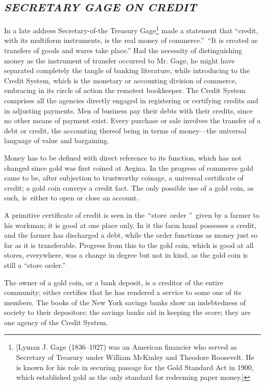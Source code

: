 \documentclass[openany,nobib]{tufte-book}
\begin{document}
\enlargethispage{\baselineskip}

\hypertarget{secretary-gage-on-credit}{%
\subsection{\texorpdfstring{\emph{SECRETARY GAGE ON
CREDIT}}{SECRETARY GAGE ON CREDIT}}\label{secretary-gage-on-credit}}

In a late address Secretary-of-the Treasury Gage\footnote{{[}Lyman J.
  Gage (1836--1927) was an American financier who served as Secretary of
  Treasury under William McKinley and Theodore Roosevelt. He is known
  for his role in securing passage for the Gold Standard Act in 1900,
  which established gold as the only standard for redeeming paper
  money.{]}} made a statement that ``credit, with its multiform
instruments, is the real money of commerce.''~``It is created as
transfers of goods and wares take place.'' Had the necessity of
distinguishing money as the instrument of transfer occurred to Mr. Gage,
he might have separated completely the tangle of banking literature,
while introducing to the Credit System, which is the monetary or
accounting division of commerce, embracing in its circle of action the
remotest bookkeeper. The Credit System comprises all the agencies
directly engaged in registering or certifying credits and in adjusting
payments. Men of business pay their debts with their credits, since no
other means of payment exist. Every purchase or sale involves the
transfer of a debt or credit, the accounting thereof being in terms of
money---the universal language of value and bargaining.~

Money has to be defined with direct reference to its function, which has
not changed since gold was first coined at Aegina. In the progress of
commerce gold came to be, after subjection to trustworthy coinage, a
universal certificate of credit; a gold coin conveys a credit fact. The
only possible use of a gold coin, as such, is~either to open or close an
account.~

A primitive certificate of credit is seen in the~``store~order ''~given
by a farmer to his workman; it is good at one place only. In it the farm
hand possesses a credit, and the farmer has discharged a debt, while the
order functions as money just so far as it is transferable. Progress
from this to the gold coin, which is good at all stores, everywhere, was
a change in degree but not in kind, as the gold coin is still a ``store
order.''~

The owner of a gold coin, or a bank deposit, is a creditor of the entire
community; either certifies that he has rendered a service to some one
of its members. The books of the New York savings banks show an
indebtedness of society to their depositors; the savings banks aid in
keeping the score; they are one agency of the Credit System. ~
\end{document}
